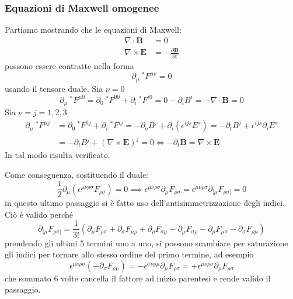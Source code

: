 \subsubsection{Equazioni di Maxwell omogenee}
Partiamo mostrando che le equazioni di Maxwell:
\begin{align}
    \nabla \cdot \bm{B} &=0 \label{eq.divB}\\
    \nabla \times \bm{E} &= - \frac{\partial \bm{B}}{\partial t}\label{eq.rotE}
\end{align}
possono essere contratte nella forma
\begin{equation}
    \partial_\mu  \ ^*F^{\mu\nu} = 0 \label{eq.maxcovomog}
\end{equation}
usando il tensore duale.
Sia $\nu = 0$
\begin{equation*}
    \partial_\mu \ ^*F^{\mu 0} = \partial_0 \ ^*F^{0 0} + \partial_i \ ^*F^{i0} = 0 - \partial_i B^i = - \nabla \cdot \bm{B} = 0
\end{equation*}
Sia $\nu = j = 1,2,3$
\begin{align*}
      \partial_\mu \ ^*F^{\mu j} &= \partial_0 \ ^*F^{0 j} + \partial_i \ ^*F^{ij} =  - \partial_o B^j +\partial_i (\epsilon^{ijs}E^s) = - \partial_t B^j + \epsilon^{ijs}\partial_i E^s \\
      &= -\partial_t B^j + (\nabla \times \bm{E})^j = 0 \iff -\partial_t \bm{B} = \nabla \times \bm{E}
\end{align*}
In tal modo risulta verificato.

Come conseguenza, sostituendo il duale:
\begin{equation*}
    \frac{1}{2}\partial_\mu(\epsilon^{\mu\nu\rho\sigma}F_{\rho\sigma}) = 0 \implies \epsilon^{\mu\nu\rho\sigma} \partial_\mu F_{\rho\sigma} = \epsilon^{\mu\nu\rho\sigma} \partial_{[\mu} F_{\rho\sigma]} = 0
\end{equation*}
in questo ultimo passaggio si è fatto uso dell'antisimmetrizzazione degli indici. Ciò è valido perché
\begin{equation*}
    \partial_{[\mu} F_{\rho\sigma]} = \frac{1}{3!}( \partial_\mu F_{\rho\sigma} + \partial_\sigma F_{\mu\rho} + \partial_\rho F_{\sigma\mu} - \partial_\mu F_{\sigma\rho} - \partial_\rho F_{\mu\sigma} - \partial_\sigma F_{\rho \mu})
\end{equation*}
prendendo gli ultimi 5 termini uno a uno, si possono scambiare per saturazione gli indici per tornare allo stesso ordine del primo termine, ad esempio
\begin{equation*}
    \epsilon^{\mu\nu\rho\sigma}(-\partial_\sigma F_{\rho \mu} ) = - \epsilon^{\sigma\nu\rho\mu}\partial_\mu F_{\rho \sigma} = + \epsilon^{\mu\nu\rho\sigma} \partial_\mu F_{\rho\sigma}
\end{equation*}
che sommato 6 volte cancella il fattore ad inizio parentesi e rende valido il passaggio.

